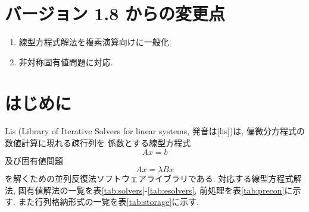 \documentclass[a4paper]{jarticle}
\begin{document}
\section*{バージョン 1.8 からの変更点}
\begin{enumerate}
\item 線型方程式解法を複素演算向けに一般化.
\item 非対称固有値問題に対応.  
\end{enumerate}

\newpage
\section{はじめに}
Lis (Library of Iterative Solvers for linear systems, 発音は[lis])は, 
偏微分方程式の数値計算に現れる疎行列を
係数とする線型方程式 
\[
Ax = b
\]
及び固有値問題
\[
Ax = \lambda Bx
\]
を解くための並列反復法ソフトウェアライブラリである\cite{nishida1}. 
対応する線型方程式解法, 固有値解法の一覧を表\ref{tab:solvers}-\ref{tab:esolvers}, 
前処理を表\ref{tab:precon}に示す. 
また行列格納形式の一覧を表\ref{tab:storage}に示す. 
\end{document}
